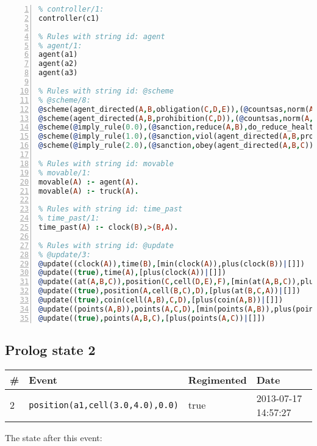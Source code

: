 \documentclass[11pt]{article}\usepackage[utf8]{inputenc}\usepackage{geometry}
\begin{document}
\begin{lstlisting}[language=Prolog, numbers=left]
% Rules with string id: controller
% controller/1:
controller(c1)

% Rules with string id: agent
% agent/1:
agent(a1)
agent(a2)
agent(a3)

% Rules with string id: @scheme
% @scheme/8:
@scheme(agent_directed(A,B,obligation(C,D,E)),(@countsas,norm(A,B,F,obligation(C,D,E)),F),false,(listTrue(C)),(time_past(D)),false,[plus(viol(agent_directed(A,B,obligation(C,D,E))))|[]],[plus(obey(agent_directed(A,B,obligation(C,D,E))))|[]])
@scheme(agent_directed(A,B,prohibition(C,D)),(@countsas,norm(A,B,E,prohibition(C,D)),E),(listTrue(C)),false,(false),false,[plus(viol(agent_directed(A,B,prohibition(C,D))))|[]],[plus(obey(agent_directed(A,B,prohibition(C,D))))|[]])
@scheme(@imply_rule(0.0),(@sanction,reduce(A,B),do_reduce_health(A,B),notifyAgent(A,changed(status))),true,false,false,false,[min(reduce(A,B))|[]],[])
@scheme(@imply_rule(1.0),(@sanction,viol(agent_directed(A,B,prohibition(C,D))),do_sanction(D)),true,false,false,false,[min(viol(agent_directed(A,B,prohibition(C,D))))|[]],[])
@scheme(@imply_rule(2.0),(@sanction,obey(agent_directed(A,B,C))),true,false,false,false,[min(obey(agent_directed(A,B,C)))|[]],[])

% Rules with string id: movable
% movable/1:
movable(A) :- agent(A).
movable(A) :- truck(A).

% Rules with string id: time_past
% time_past/1:
time_past(A) :- clock(B),>(B,A).

% Rules with string id: @update
% @update/3:
@update((clock(A)),time(B),[min(clock(A)),plus(clock(B))|[]])
@update((true),time(A),[plus(clock(A))|[]])
@update((at(A,B,C)),position(C,cell(D,E),F),[min(at(A,B,C)),plus(at(D,E,C))|[]])
@update((true),position(A,cell(B,C),D),[plus(at(B,C,A))|[]])
@update((true),coin(cell(A,B),C,D),[plus(coin(A,B))|[]])
@update((points(A,B)),points(A,C,D),[min(points(A,B)),plus(points(A,D))|[]])
@update((true),points(A,B,C),[plus(points(A,C))|[]])

\end{lstlisting}
\clearpage 
\subsection{Prolog state 2}
\begin{table}[ht]
\centering 
\begin{tabular}{l l l l} 
\textbf{\#} & \textbf{Event} & \textbf{Regimented} & \textbf{Date} \\ [0.5ex] 
\hline
2&\texttt{position(a1,cell(3.0,4.0),0.0)}&true&2013-07-17 14:57:27\\ [1ex] \hline\end{tabular}
\end{table}
The state after this event:
\end{document}

